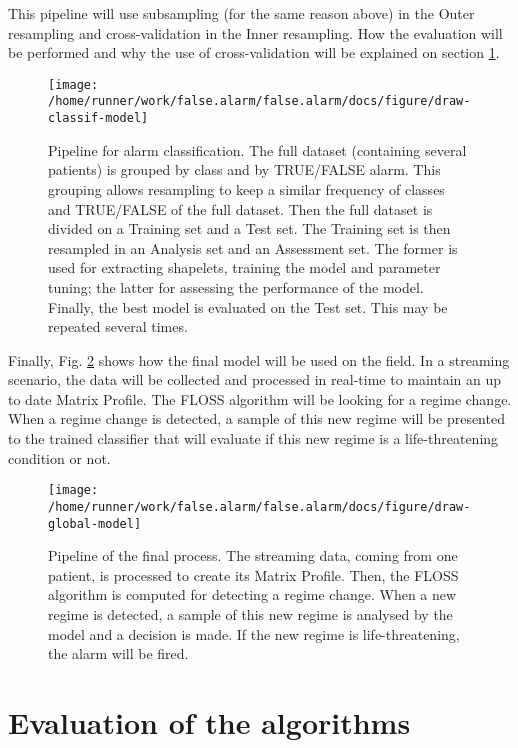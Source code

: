 \documentclass[12pt,twoside]{fmupthesis}
\begin{document}
This pipeline will use subsampling (for the same reason above) in the Outer resampling and
cross-validation in the Inner resampling. How the evaluation will be performed and why the use of
cross-validation will be explained on section \ref{evaluation}.
\begin{figure}

{\centering \texttt{[image: /home/runner/work/false.alarm/false.alarm/docs/figure/draw-classif-model]} 

}

\caption{Pipeline for alarm classification. The full dataset (containing several patients) is grouped by class and by TRUE/FALSE alarm. This grouping allows resampling to keep a similar frequency of classes and TRUE/FALSE of the full dataset. Then the full dataset is divided on a Training set and a Test set. The Training set is then resampled in an Analysis set and an Assessment set. The former is used for extracting shapelets, training the model and parameter tuning; the latter for assessing the performance of the model. Finally, the best model is evaluated on the Test set. This may be repeated several times.}\label{fig:shapelets}
\end{figure}
Finally, Fig. \ref{fig:fullmodel} shows how the final model will be used on the field. In a
streaming scenario, the data will be collected and processed in real-time to maintain an up to date
Matrix Profile. The FLOSS algorithm will be looking for a regime change. When a regime change is
detected, a sample of this new regime will be presented to the trained classifier that will evaluate
if this new regime is a life-threatening condition or not.
\begin{figure}

{\centering \texttt{[image: /home/runner/work/false.alarm/false.alarm/docs/figure/draw-global-model]} 

}

\caption{Pipeline of the final process. The streaming data, coming from one patient, is processed to create its Matrix Profile. Then, the FLOSS algorithm is computed for detecting a regime change. When a new regime is detected, a sample of this new regime is analysed by the model and a decision is made. If the new regime is life-threatening, the alarm will be fired.}\label{fig:fullmodel}
\end{figure}
\hypertarget{evaluation}{%
\section{Evaluation of the algorithms}\label{evaluation}}
\end{document}
